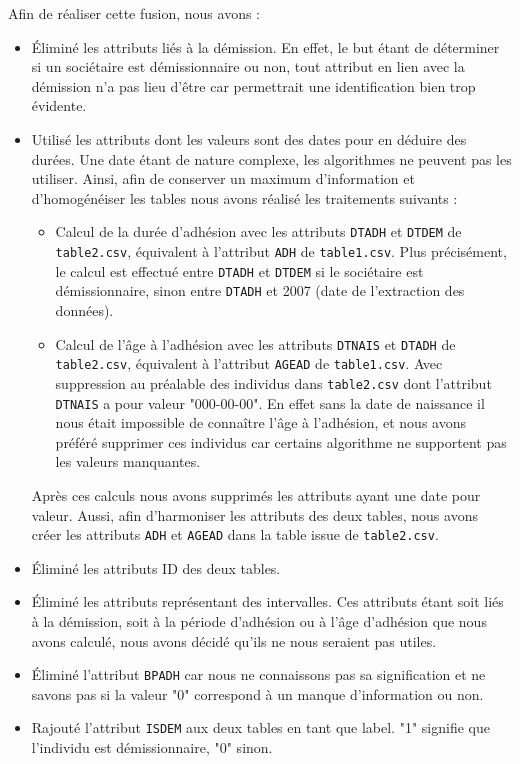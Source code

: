 \documentclass{ceri/sty/rapport}
\begin{document}
Afin de réaliser cette fusion, nous avons :
\begin{itemize}
    \item Éliminé les attributs liés à la démission. En effet, le but étant de déterminer si un sociétaire est démissionnaire ou non, tout attribut en lien avec la démission n'a pas lieu d'être car permettrait une identification bien trop évidente.
    \item Utilisé les attributs dont les valeurs sont des dates pour en déduire des durées. Une date étant de nature complexe, les algorithmes ne peuvent pas les utiliser. Ainsi, afin de conserver un maximum d'information et d'homogénéiser les tables nous avons réalisé les traitements suivants :
    \begin{itemize}
        \item Calcul de la durée d'adhésion avec les attributs \texttt{DTADH} et \texttt{DTDEM} de \texttt{table2.csv}, équivalent à l'attribut \texttt{ADH} de \texttt{table1.csv}. Plus précisément, le calcul est effectué entre \texttt{DTADH} et \texttt{DTDEM} si le sociétaire est démissionnaire, sinon entre \texttt{DTADH} et 2007 (date de l'extraction des données).
        \item Calcul de l'âge à l'adhésion avec les attributs \texttt{DTNAIS} et \texttt{DTADH} de \texttt{table2.csv}, équivalent à l'attribut \texttt{AGEAD} de \texttt{table1.csv}. Avec suppression au préalable des individus dans \texttt{table2.csv} dont l'attribut \texttt{DTNAIS} a pour valeur "000-00-00". En effet sans la date de naissance il nous était impossible de connaître l'âge à l'adhésion, et nous avons préféré supprimer ces individus car certains algorithme ne supportent pas les valeurs manquantes.
    \end{itemize}
    Après ces calculs nous avons supprimés les attributs ayant une date pour valeur. Aussi, afin d'harmoniser les attributs des deux tables, nous avons créer les attributs \texttt{ADH} et \texttt{AGEAD} dans la table issue de \texttt{table2.csv}.
    \item Éliminé les attributs ID des deux tables.
    \item Éliminé les attributs représentant des intervalles. Ces attributs étant soit liés à la démission, soit à la période d'adhésion ou à l'âge d'adhésion que nous avons calculé, nous avons décidé qu'ils ne nous seraient pas utiles.
    \item Éliminé l'attribut \texttt{BPADH} car nous ne connaissons pas sa signification et ne savons pas si la valeur "0" correspond à un manque d'information ou non.
    \item Rajouté l'attribut \texttt{ISDEM} aux deux tables en tant que label. "1" signifie que l'individu est démissionnaire, "0" sinon.
\end{itemize}
\end{document}
